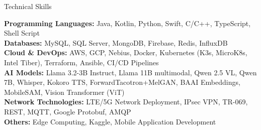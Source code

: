 \documentclass{resume}
\begin{document}
    \begin{rSection}{Technical Skills}

        \textbf{Programming Languages:} Java, Kotlin, Python, Swift, C/C++, TypeScript, Shell Script\\
        \textbf{Databases:} MySQL, SQL Server, MongoDB, Firebase, Redis, InfluxDB\\
        \textbf{Cloud \& DevOps:} AWS, GCP, Nebius, Docker, Kubernetes (K3s, MicroK8s, Intel Tiber), Terraform, Ansible, CI/CD Pipelines\\
        \textbf{AI Models:} Llama 3.2-3B Instruct, Llama 11B multimodal, Qwen 2.5 VL, Qwen 7B, Whisper, Kokoro TTS, ForwardTacotron+MelGAN, BAAI Embeddings, MobileSAM, Vision Transformer (ViT)\\
        \textbf{Network Technologies:} LTE/5G Network Deployment, IPsec VPN, TR-069, REST, MQTT, Google Protobuf, AMQP\\
        \textbf{Others:} Edge Computing, Kaggle, Mobile Application Development

    \end{rSection}
\end{document}
